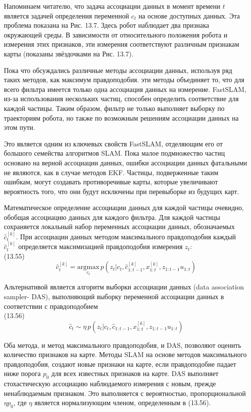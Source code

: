 \documentclass[10pt,a4paper]{article}
\begin{document}
Напоминаем читателю, что задача ассоциации данных в момент времени $t$ является задачей определения переменной $c_t$ на основе доступных данных. Эта проблема показана на Рис. 13.7. Здесь робот наблюдает два признака окружающей среды. В зависимости от относительного положения робота и измерения этих признаков, эти измерения соответствуют различным признакам карты (показаны звёздочками на Рис. 13.7).

Пока что обсуждались различные методы ассоциации данных, используя ряд таких методов, как максимум правдоподобия. эти методы объединяет то, что для всего фильтра имеется только одна ассоциация данных на измерение. FastSLAM, из-за использования нескольких частиц, способен определить соответствие для каждой частицы. Таким образом, фильтр не только выполняет выборку по траекториям робота, но также по возможным решениям ассоциации данных на этом пути. 

Это является одним из ключевых свойств FastSLAM, отделяющим его от большого семейства алгоритмов SLAM. Пока малое подмножество частиц основано на верной ассоциации данных, ошибки ассоциации данных фатальными не являются, как в случае методов EKF. Частицы, подверженные таким ошибкам, могут создавать противоречивые карты, которые увеличивают вероятность того, что они будут исключены при перевыборке из будущих карт.

Математическое определение ассоциации данных для каждой частицы очевидно, обобщая ассоциацию данных для каждого фильтра. Для каждой частицы сохраняется локальный набор переменных ассоциации данных, обозначаемых $\hat{c}_t^{[k]}$. При ассоциации данных методом максимального правдоподобия каждый $\hat{c}_t^{[k]}$ определяется
максимизацией правдоподобия измерения $z_t$:\\

(13.55)
$$\hat{c}_t^{[k]}=\underset{c_t}{\text{argmax}}\,p(z_t|c_t,\hat{c}_{1:t-1}^{[k]},x_{1:t}^{[k]},z_{1:t-1}u_{1:t})$$

Альтернативой является алгоритм выборки ассоциации данных (data association sampler- DAS), выполняющий выборку переменной ассоциации данных в соответствии с правдоподобием\\

(13.56)
$$\hat{c}_t\sim\eta\,p(z_t|c_t,\hat{c}_{1:t-1},x_{1:t}^{[k]},z_{1:t-1}u_{1:t})$$

Оба метода, и метод максимального правдоподобия, и DAS, позволяют оценить количество признаков на карте. Методы SLAM на основе методов максимального правдоподобия, создают новые признаки на карте, если правдоподобие падает ниже порога $p_0$ для всех известных признаков на карте. DAS выполняет стохастическую ассоциацию наблюдаемого измерения с новым, прежде ненаблюдаемым признаком. Это выполняется с вероятностью, пропорциональной $\eta p_0$, где $\eta$ является нормализующим членом, определенным в (13.56).\\
\end{document}
